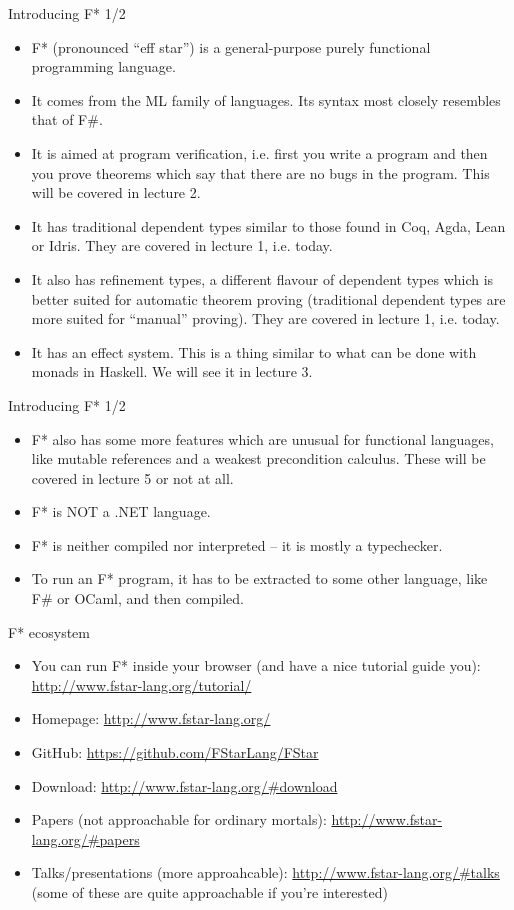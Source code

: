 \documentclass{beamer}
\begin{document}
\begin{frame}{Introducing F* 1/2}
\begin{itemize}
	\item F* (pronounced ``eff star'') is a general-purpose purely functional programming language.
	\item It comes from the ML family of languages. Its syntax most closely resembles that of F\#.
	\item It is aimed at program verification, i.e. first you write a program and then you prove theorems which say that there are no bugs in the program. This will be covered in lecture 2.
	\item It has traditional dependent types similar to those found in Coq, Agda, Lean or Idris. They are covered in lecture 1, i.e. today.
	\item It also has refinement types, a different flavour of dependent types which is better suited for automatic theorem proving (traditional dependent types are more suited for ``manual'' proving). They are covered in lecture 1, i.e. today.
	\item It has an effect system. This is a thing similar to what can be done with monads in Haskell. We will see it in lecture 3.
\end{itemize}
\end{frame}

\begin{frame}{Introducing F* 1/2}
\begin{itemize}
	\item F* also has some more features which are unusual for functional languages, like mutable references and a weakest precondition calculus. These will be covered in lecture 5 or not at all.
	\item F* is NOT a .NET language.
	\item F* is neither compiled nor interpreted -- it is mostly a typechecker.
	\item To run an F* program, it has to be extracted to some other language, like F\# or OCaml, and then compiled.
\end{itemize}
\end{frame}

\begin{frame}{F* ecosystem}
\begin{itemize}
	\item You can run F* inside your browser (and have a nice tutorial guide you): \url{http://www.fstar-lang.org/tutorial/}
	\item Homepage: \url{http://www.fstar-lang.org/}
	\item GitHub: \url{https://github.com/FStarLang/FStar}
	\item Download: \url{http://www.fstar-lang.org/\#download}
	\item Papers (not approachable for ordinary mortals): \url{http://www.fstar-lang.org/\#papers}
	\item Talks/presentations (more approahcable): \url{http://www.fstar-lang.org/\#talks} (some of these are quite approachable if you're interested)  
\end{itemize}
\end{frame}
\end{document}
